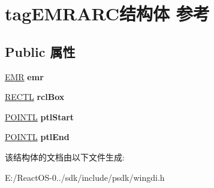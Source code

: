 \hypertarget{structtag_e_m_r_a_r_c}{}\section{tag\+E\+M\+R\+A\+R\+C结构体 参考}
\label{structtag_e_m_r_a_r_c}
\subsection*{Public 属性}
\begin{DoxyCompactItemize}
\item 
\mbox{\label{structtag_e_m_r_a_r_c_aa9b78eb1c174a4ebc9a9ed092eb5d113}} 
\hyperlink{structtag_e_m_r}{E\+MR} {\bfseries emr}
\item 
\mbox{\label{structtag_e_m_r_a_r_c_a64b0719d95e92bedd66acf47d6512e78}} 
\hyperlink{struct___r_e_c_t_l}{R\+E\+C\+TL} {\bfseries rcl\+Box}
\item 
\mbox{\label{structtag_e_m_r_a_r_c_a6189575e0b1864bca6499dce50175cd2}} 
\hyperlink{struct___p_o_i_n_t_l}{P\+O\+I\+N\+TL} {\bfseries ptl\+Start}
\item 
\mbox{\label{structtag_e_m_r_a_r_c_a76a9aee311c15ced6da8acfd68be854e}} 
\hyperlink{struct___p_o_i_n_t_l}{P\+O\+I\+N\+TL} {\bfseries ptl\+End}
\end{DoxyCompactItemize}


该结构体的文档由以下文件生成\+:\begin{DoxyCompactItemize}
\item 
E\+:/\+React\+O\+S-\/0../sdk/include/psdk/wingdi.\+h\end{DoxyCompactItemize}
